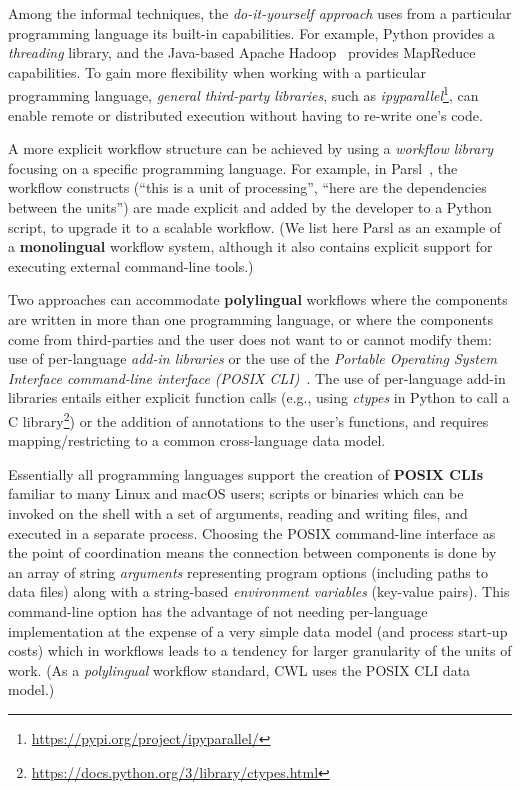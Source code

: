 \documentclass[sigconf,revew,screen,timestamp,nonacm]{acmart}
\begin{document}
Among the informal techniques, the \textit{do-it-yourself approach} uses from a particular programming language its built-in capabilities. For example, Python provides a \emph{threading} library, and the Java-based Apache Hadoop~\cite{taylor_overview_2010} provides MapReduce capabilities. To gain more flexibility when working with a particular programming language, \textit{general third-party libraries}, such as \emph{ipyparallel}\footnote{\url{https://pypi.org/project/ipyparallel/}}, can enable remote or distributed execution without having to re-write one's code.

A more explicit workflow structure can be achieved by using a \textit{workflow library} focusing on a specific programming language. For example, in Parsl~\cite{babuji_parsl_2019}, the workflow constructs (``this is a unit of processing'', ``here are the dependencies between the units'') are made explicit and added by the developer to a Python script, to upgrade it to a scalable workflow. (We list here Parsl as an example of a \textbf{monolingual} workflow system, although it also contains explicit support for executing external command-line tools.)

Two approaches can accommodate \textbf{polylingual} workflows where the components are written in more than one programming language, or where the components come from third-parties and the user does not want to or cannot modify them: use of per-language \textit{add-in libraries} or the use of the \textit{Portable Operating System Interface command-line interface (POSIX CLI)}~\cite{the_austin_group_posix1-2008_2008}. The use of per-language add-in libraries entails either explicit function calls (e.g., using \emph{ctypes} in Python to call a C library\footnote{\url{https://docs.python.org/3/library/ctypes.html}}) or the addition of annotations to the user's functions, and requires mapping/restricting to a common cross-language data model.

Essentially all programming languages support the creation of \textbf{POSIX CLIs} familiar to many Linux and macOS users; scripts or binaries which can be invoked on the shell with a set of arguments, reading and writing files, and executed in a separate process. Choosing the POSIX command-line interface as the point of coordination means the connection between components is done by an array of string \textit{arguments} representing program options (including paths to data files) along with a string-based \textit{environment variables} (key-value pairs). This command-line option has the advantage of not needing per-language implementation at the expense of a very simple data model (and process start-up costs) which in workflows leads to a tendency for larger granularity of the units of work. (As a \textit{polylingual} workflow standard, CWL uses the POSIX CLI data model.)
\end{document}
